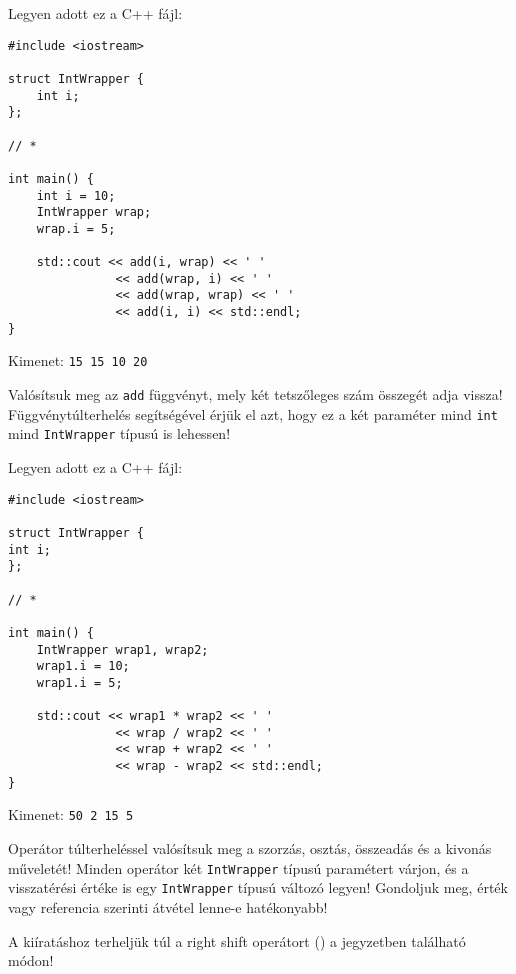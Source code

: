 \documentclass[../exercise_book/exercise_book.tex]{subfiles}
\begin{document}
	\begin{exercise}
		Legyen adott ez a C++ fájl:
		
		\smallskip
		\begin{lstlisting}
#include <iostream>

struct IntWrapper {
	int i;
};

// *

int main() {
	int i = 10;
	IntWrapper wrap;
	wrap.i = 5;
	
	std::cout << add(i, wrap) << ' '
	           << add(wrap, i) << ' '
	           << add(wrap, wrap) << ' '
	           << add(i, i) << std::endl;
}
		\end{lstlisting}
		Kimenet: \texttt{15 15 10 20}
		
		\smallskip
		Valósítsuk meg az \texttt{add} függvényt, mely két tetszőleges szám összegét adja vissza! Függvénytúlterhelés segítségével érjük el azt, hogy ez a két paraméter mind \texttt{int} mind \texttt{IntWrapper} típusú is lehessen!
	\end{exercise}
	\begin{exercise}
		Legyen adott ez a C++ fájl:
		
		\smallskip
		\fbox{\textbf{03\_02overload\_main.cpp}}
		\begin{lstlisting}
#include <iostream>

struct IntWrapper {
int i;
};

// *

int main() {
	IntWrapper wrap1, wrap2;
	wrap1.i = 10;
	wrap1.i = 5;
	
	std::cout << wrap1 * wrap2 << ' '
	           << wrap / wrap2 << ' '
	           << wrap + wrap2 << ' '
	           << wrap - wrap2 << std::endl;
}
		\end{lstlisting}
		Kimenet: \texttt{50 2 15 5}
		
		\smallskip
		Operátor túlterheléssel valósítsuk meg a szorzás, osztás, összeadás és a kivonás műveletét! Minden operátor két \texttt{IntWrapper} típusú paramétert várjon, és a visszatérési értéke is egy \texttt{IntWrapper} típusú változó legyen! Gondoljuk meg, érték vagy referencia szerinti átvétel lenne-e hatékonyabb!
		
		A kiíratáshoz terheljük túl a right shift operátort (\texttt{\<}) a jegyzetben található módon!
	\end{exercise}
	
\end{document}
